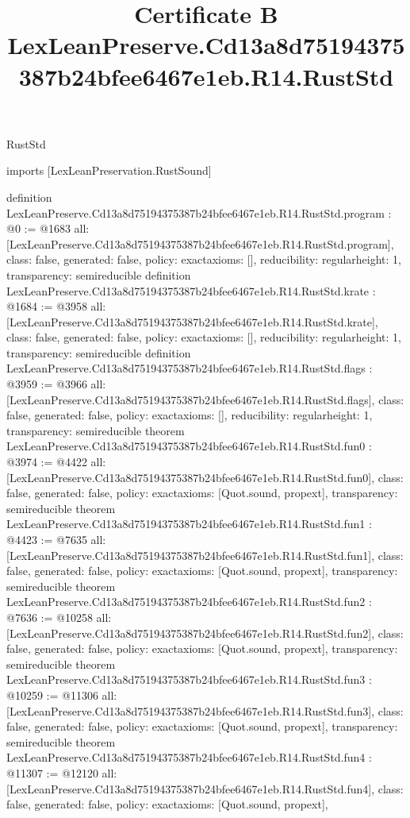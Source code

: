 \begin{lexlean}{RustStd}
\title{Certificate B LexLeanPreserve.Cd13a8d75194375387b24bfee6467e1eb.R14.RustStd}
\begin{coremodule}
imports [LexLeanPreservation.RustSound]

definition LexLeanPreserve.Cd13a8d75194375387b24bfee6467e1eb.R14.RustStd.program : @0 := @1683 {
  all: [LexLeanPreserve.Cd13a8d75194375387b24bfee6467e1eb.R14.RustStd.program],
  class: false,
  generated: false,
  policy: exact{axioms: []},
  reducibility: regular{height: 1},
  transparency: semireducible
}
definition LexLeanPreserve.Cd13a8d75194375387b24bfee6467e1eb.R14.RustStd.krate : @1684 := @3958 {
  all: [LexLeanPreserve.Cd13a8d75194375387b24bfee6467e1eb.R14.RustStd.krate],
  class: false,
  generated: false,
  policy: exact{axioms: []},
  reducibility: regular{height: 1},
  transparency: semireducible
}
definition LexLeanPreserve.Cd13a8d75194375387b24bfee6467e1eb.R14.RustStd.flags : @3959 := @3966 {
  all: [LexLeanPreserve.Cd13a8d75194375387b24bfee6467e1eb.R14.RustStd.flags],
  class: false,
  generated: false,
  policy: exact{axioms: []},
  reducibility: regular{height: 1},
  transparency: semireducible
}
theorem LexLeanPreserve.Cd13a8d75194375387b24bfee6467e1eb.R14.RustStd.fun0 : @3974 := @4422 {
  all: [LexLeanPreserve.Cd13a8d75194375387b24bfee6467e1eb.R14.RustStd.fun0],
  class: false,
  generated: false,
  policy: exact{axioms: [Quot.sound, propext]},
  transparency: semireducible
}
theorem LexLeanPreserve.Cd13a8d75194375387b24bfee6467e1eb.R14.RustStd.fun1 : @4423 := @7635 {
  all: [LexLeanPreserve.Cd13a8d75194375387b24bfee6467e1eb.R14.RustStd.fun1],
  class: false,
  generated: false,
  policy: exact{axioms: [Quot.sound, propext]},
  transparency: semireducible
}
theorem LexLeanPreserve.Cd13a8d75194375387b24bfee6467e1eb.R14.RustStd.fun2 : @7636 := @10258 {
  all: [LexLeanPreserve.Cd13a8d75194375387b24bfee6467e1eb.R14.RustStd.fun2],
  class: false,
  generated: false,
  policy: exact{axioms: [Quot.sound, propext]},
  transparency: semireducible
}
theorem LexLeanPreserve.Cd13a8d75194375387b24bfee6467e1eb.R14.RustStd.fun3 : @10259 := @11306 {
  all: [LexLeanPreserve.Cd13a8d75194375387b24bfee6467e1eb.R14.RustStd.fun3],
  class: false,
  generated: false,
  policy: exact{axioms: [Quot.sound, propext]},
  transparency: semireducible
}
theorem LexLeanPreserve.Cd13a8d75194375387b24bfee6467e1eb.R14.RustStd.fun4 : @11307 := @12120 {
  all: [LexLeanPreserve.Cd13a8d75194375387b24bfee6467e1eb.R14.RustStd.fun4],
  class: false,
  generated: false,
  policy: exact{axioms: [Quot.sound, propext]},
}
\end{coremodule}
\end{lexlean}
